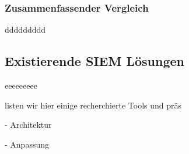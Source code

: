 \subsubsection{Zusammenfassender Vergleich}
ddddddddd

\subsection{Existierende SIEM Lösungen}
eeeeeeeee

listen wir hier einige recherchierte Tools und präs






- Architektur %

- Anpassung %









